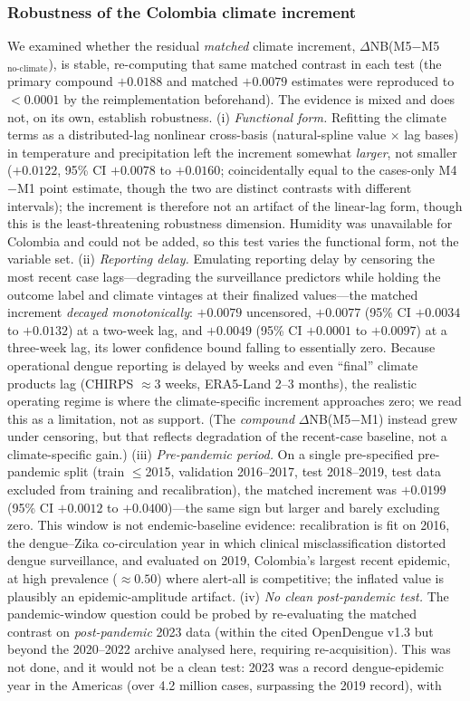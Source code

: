 \documentclass[11pt,a4paper]{article}
\begin{document}
\subsubsection*{Robustness of the Colombia climate increment}
We examined whether the residual \emph{matched} climate increment, $\Delta$NB(M5$-$M5$_{\text{no-climate}}$), is stable, re-computing that same matched contrast in each test (the primary compound $+0.0188$ and matched $+0.0079$ estimates were reproduced to $<0.0001$ by the reimplementation beforehand). The evidence is mixed and does not, on its own, establish robustness. (i) \emph{Functional form.} Refitting the climate terms as a distributed-lag nonlinear cross-basis (natural-spline value $\times$ lag bases) in temperature and precipitation left the increment somewhat \emph{larger}, not smaller ($+0.0122$, 95\% CI $+0.0078$ to $+0.0160$; coincidentally equal to the cases-only M4$-$M1 point estimate, though the two are distinct contrasts with different intervals); the increment is therefore not an artifact of the linear-lag form, though this is the least-threatening robustness dimension. Humidity was unavailable for Colombia and could not be added, so this test varies the functional form, not the variable set. (ii) \emph{Reporting delay.} Emulating reporting delay by censoring the most recent case lags---degrading the surveillance predictors while holding the outcome label and climate vintages at their finalized values---the matched increment \emph{decayed monotonically}: $+0.0079$ uncensored, $+0.0077$ (95\% CI $+0.0034$ to $+0.0132$) at a two-week lag, and $+0.0049$ (95\% CI $+0.0001$ to $+0.0097$) at a three-week lag, its lower confidence bound falling to essentially zero. Because operational dengue reporting is delayed by weeks and even ``final'' climate products lag (CHIRPS $\approx$3 weeks, ERA5-Land 2--3 months), the realistic operating regime is where the climate-specific increment approaches zero; we read this as a limitation, not as support. (The \emph{compound} $\Delta$NB(M5$-$M1) instead grew under censoring, but that reflects degradation of the recent-case baseline, not a climate-specific gain.) (iii) \emph{Pre-pandemic period.} On a single pre-specified pre-pandemic split (train $\le$2015, validation 2016--2017, test 2018--2019, test data excluded from training and recalibration), the matched increment was $+0.0199$ (95\% CI $+0.0012$ to $+0.0400$)---the same sign but larger and barely excluding zero. This window is not endemic-baseline evidence: recalibration is fit on 2016, the dengue--Zika co-circulation year in which clinical misclassification distorted dengue surveillance, and evaluated on 2019, Colombia's largest recent epidemic, at high prevalence ($\approx0.50$) where alert-all is competitive; the inflated value is plausibly an epidemic-amplitude artifact. (iv) \emph{No clean post-pandemic test.} The pandemic-window question could be probed by re-evaluating the matched contrast on \emph{post-pandemic} 2023 data (within the cited OpenDengue v1.3 but beyond the 2020--2022 archive analysed here, requiring re-acquisition). This was not done, and it would not be a clean test: 2023 was a record dengue-epidemic year in the Americas (over 4.2 million cases, surpassing the 2019 record), with 
\end{document}
